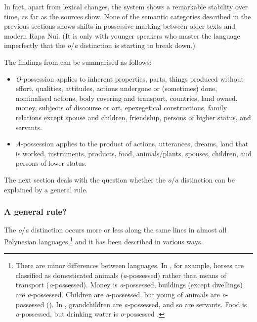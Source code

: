 In fact, apart from lexical changes, the system shows a remarkable stability over time, as far as the sources show. None of the semantic categories described in the previous sections shows shifts in possessive marking between older texts and modern Rapa Nui. (It is only with younger speakers who master the language imperfectly that the \textit{o}/\textit{a} distinction is starting to break down.)

The findings from  can be summarised as follows:

\begin{itemize}
\item 
\textit{O}-possession applies to inherent properties, parts, things produced without effort, qualities, attitudes, actions undergone or (sometimes) done, nominalised actions, body covering and transport, countries, land owned, money, subjects of discourse or art, epexegetical constructions, family relations except spouse and children, friendship, persons of higher status, and servants.

\item 
\textit{A}-possession applies to the product of actions, utterances, dreams, land that is worked, instruments, products, food, animals/plants, spouses, children, and persons of lower status.

\end{itemize}

The next section deals with the question whether the \textit{o}/\textit{a} distinction can be explained by a general rule.

\subsubsection{A general rule?}\label{sec:6.3.4.2}

The \textit{o}/\textit{a} distinction occurs more or less along the same lines in almost all Polynesian languages,\footnote{\label{fn:303}There are minor differences between languages. In , for example, horses are classified as domesticated animals (\textit{a}{}-possessed) rather than means of transport (\textit{o}{}-possessed). Money is \textit{a}{}-possessed, buildings (except dwellings) are \textit{a}{}-possessed. Children are \textit{a}{}-possessed, but young of animals are \textit{o}{}-possessed (\citealt[86–92]{AcadémieTahitienne1986}). In , grandchildren are \textit{a-}possessed, and so are servants. Food is \textit{a}{}-possessed, but drinking water is \textit{o}{}-possessed \citep[44]{Biggs1973}.} and it has been described in various ways. 

